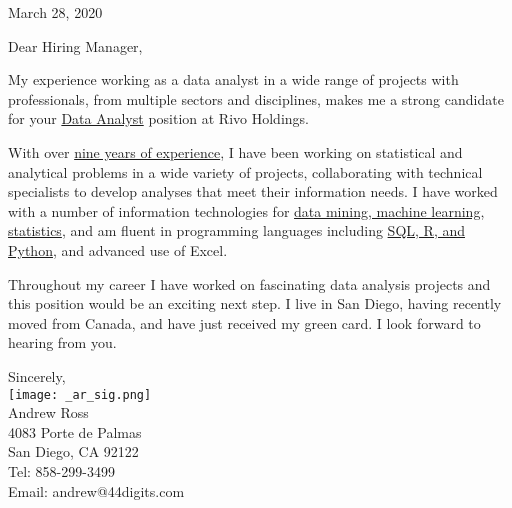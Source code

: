 \documentclass[letterpaper]{article}
\newcommand{\CVjobTitle}{Data Analyst}
\newcommand{\CVcompany}{Rivo Holdings}
\newcommand{\impt}[1]{\uline{#1}}
\begin{document}
\large

\null\hfill March 28, 2020
\vspace{1em}

Dear Hiring Manager,

My experience working as a data analyst in a wide range of
projects with professionals, from multiple sectors and disciplines, makes me a
strong candidate for your \impt{\CVjobTitle} position at \CVcompany.

With over \impt{nine years of experience}, I have been working on statistical
and analytical problems in a wide variety of projects, collaborating with
technical specialists to develop analyses that meet their information needs.
I have worked with a number of information technologies for 
\impt{data mining, machine learning, statistics},
and am fluent in programming languages including \impt{SQL, R, and
Python}, and advanced use of Excel. 

Throughout my career I have worked on fascinating data analysis
projects and this position would be an exciting next step.  
I live in San Diego, having recently moved from Canada, and have just received
my green card. I look forward to hearing from you.  


Sincerely,\\
\hspace{1em} \texttt{[image: \_ar\_sig.png]} \\
Andrew Ross \\
\small
4083 Porte de Palmas \\
San Diego, CA  92122 \\
Tel: 858-299-3499 \\
Email: andrew@44digits.com
\end{document}
